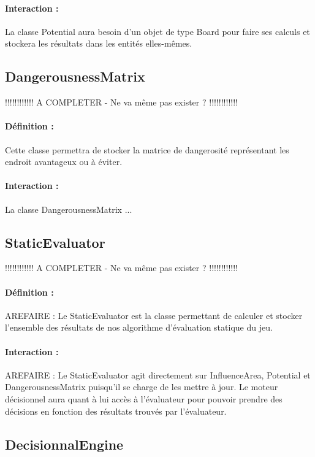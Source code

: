 			\paragraph{Interaction :}
			La classe Potential aura besoin d'un objet de type Board pour faire ses calculs et stockera les résultats dans les 
			entités elles-mêmes.

		\subsection*{DangerousnessMatrix}

			!!!!!!!!!!!! A COMPLETER - Ne va même pas exister ? !!!!!!!!!!!!
			\paragraph{Définition :}
			Cette classe permettra de stocker la matrice de dangerosité représentant les endroit avantageux ou à éviter.
			\paragraph{Interaction :}
			La classe DangerousnessMatrix ...

		\subsection*{StaticEvaluator}

			!!!!!!!!!!!! A COMPLETER - Ne va même pas exister ? !!!!!!!!!!!!
			\paragraph{Définition :}
			AREFAIRE : Le StaticEvaluator est la classe permettant de calculer et stocker l'ensemble des résultats de nos algorithme 
			d'évaluation statique du jeu.
			\paragraph{Interaction :}
			AREFAIRE : Le StaticEvaluator agit directement sur InfluenceArea, Potential et DangerousnessMatrix puisqu'il se charge 
			de les mettre à jour. Le moteur décisionnel aura quant à lui accès à l'évaluateur pour pouvoir prendre des décisions en fonction 
			des résultats trouvés par l'évaluateur.

		\subsection*{DecisionnalEngine}


